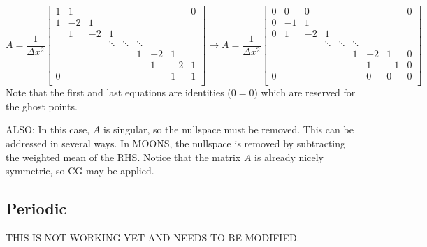 \documentclass[landscape]{article}
\begin{document}
\[ A = \frac{1}{\Delta x^2} \left[\begin{array}{ccccccccc}
1  & 1     &           &           &           &           &           &         &  0 \\
1  & -2    & 1         &           &           &           &           &         &    \\
   & 1     & -2        & 1         &           &           &           &         &    \\
   &       &           & \ddots    & \ddots    & \ddots    &           &         &    \\
   &       &           &           &           & 1         & -2        & 1       &    \\
   &       &           &           &           &           &  1        & -2      &  1 \\
0  &       &           &           &           &           &           & 1       &  1 \\
\end{array} \right]
\rightarrow
A = \frac{1}{\Delta x^2} \left[\begin{array}{ccccccccc}
0  & 0     & 0         &           &           &           &           &         &  0 \\
0  & -1    & 1         &           &           &           &           &         &    \\
0  & 1     & -2        & 1         &           &           &           &         &    \\
   &       &           & \ddots    & \ddots    & \ddots    &           &         &    \\
   &       &           &           &           & 1         & -2        & 1       &  0 \\
   &       &           &           &           &           &  1        & -1      &  0 \\
0  &       &           &           &           &           &  0        & 0       &  0 \\
\end{array} \right]
\]
Note that the first and last equations are identities ($0=0$) which are reserved for the ghost points.

ALSO: In this case, $A$ is singular, so the nullspace must be removed. This can be addressed in several ways. In MOONS, the nullspace is removed by subtracting the weighted mean of the RHS. Notice that the matrix $A$ is already nicely symmetric, so CG may be applied.

\subsection{Periodic}
THIS IS NOT WORKING YET AND NEEDS TO BE MODIFIED.
\end{document}
